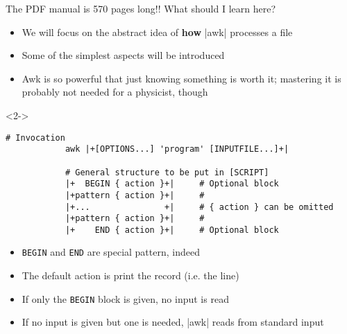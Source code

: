 \begin{frame}[fragile]{The PDF manual is 570 pages long!! What should I learn here?}
    \vspace{-4mm}
    \begin{itemize}
        \item We will focus on the abstract idea of \textbf{how} \bash|awk| processes a file
        \item Some of the simplest aspects will be introduced
        \item Awk is so powerful that just knowing something is worth it; mastering it is probably not needed for a physicist, though
    \end{itemize}
    \begin{uncoverenv}<2->
        \begin{lstlisting}[style=MyBash, numbers=none, aboveskip=2mm, belowskip=-5mm]
            # Invocation
            awk |+[OPTIONS...] 'program' [INPUTFILE...]+|

            # General structure to be put in [SCRIPT]
            |+  BEGIN { action }+|     # Optional block
            |+pattern { action }+|     #
            |+...               +|     # { action } can be omitted
            |+pattern { action }+|     #
            |+    END { action }+|     # Optional block
        \end{lstlisting}
    \end{uncoverenv}
    \begin{itemize}[<3>]
        \item \texttt{BEGIN} and \texttt{END} are special pattern, indeed
        \item The default action is print the record (i.e. the line)
        \item If only the \texttt{BEGIN} block is given, no input is read
        \item If no input is given but one is needed, \bash|awk| reads from standard input
    \end{itemize}
\end{frame}
